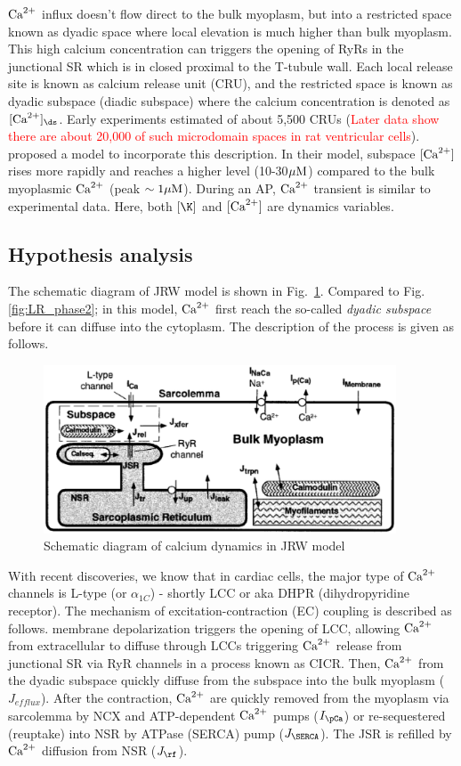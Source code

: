 ${\text{Ca}^{2+}}$ influx doesn't flow direct to the bulk myoplasm, but into a restricted
space known as dyadic space where local elevation is much higher than bulk
myoplasm. This high calcium concentration can triggers the opening of RyRs in
the junctional SR which is in closed proximal to the T-tubule wall. Each local
release site is known as calcium release unit (CRU), and the restricted space is
known as dyadic subspace (diadic subspace) where the calcium concentration is
denoted as $[\Ca]_\ds$. Early experiments estimated of about 5,500 CRUs
(\textcolor{red}{Later data show there are about 20,000 of such microdomain
spaces in rat ventricular cells}). \citep{jafri1998cad} proposed a model to
incorporate this description.  In their model, subspace $[{\text{Ca}^{2+}}]$ rises more
rapidly and reaches a higher level (10-30${\mu\text{M}}$) compared to the bulk myoplasmic
${\text{Ca}^{2+}}$ (peak $\sim 1{\mu\text{M}}$). During an AP, ${\text{Ca}^{2+}}$ transient is similar to
experimental data. Here, both $[\K]$ and $[{\text{Ca}^{2+}}]$ are dynamics variables.

\subsection{Hypothesis analysis}
\label{sec:hypothesis-analysis-5}


The schematic diagram of JRW model is shown in
Fig.~\ref{fig:JRW_model}. Compared to Fig. \ref{fig:LR_phase2}; in
this model, ${\text{Ca}^{2+}}$ first reach the so-called {\it dyadic subspace}
before it can diffuse into the cytoplasm. The description of the
process is given as follows.
\begin{figure}[hbt]
  \centerline{\includegraphics[height=5cm,
    angle=0]{./images/JRW_model.eps}}
\caption{Schematic diagram of calcium dynamics in JRW model}
\label{fig:JRW_model}
\end{figure}

With recent discoveries, we know that in cardiac cells, the major  type of ${\text{Ca}^{2+}}$
channels is L-type (or $\alpha_{1C}$) - shortly LCC or aka DHPR (dihydropyridine
receptor). The mechanism of excitation-contraction (EC) coupling is described as
follows. membrane depolarization triggers the opening of LCC, allowing ${\text{Ca}^{2+}}$
from extracellular  to diffuse through LCCs triggering ${\text{Ca}^{2+}}$ release from
junctional SR via RyR  channels in a process known as CICR. Then, ${\text{Ca}^{2+}}$ from the
dyadic subspace quickly diffuse from the subspace into the bulk myoplasm
($J_{efflux}$). After the contraction, ${\text{Ca}^{2+}}$ are quickly removed from the
myoplasm via sarcolemma by NCX and ATP-dependent ${\text{Ca}^{2+}}$ pumps ($I_\pCa$) or
re-sequestered (reuptake) into NSR by ATPase (SERCA) pump ($J_\SERCA$). The JSR
is refilled by ${\text{Ca}^{2+}}$ diffusion from NSR ($J_\rf$).


